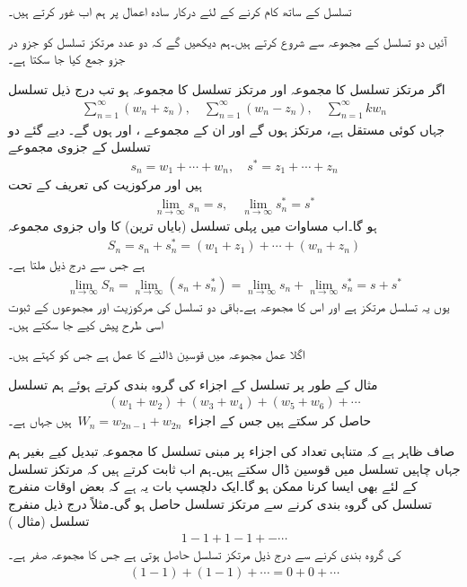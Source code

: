تسلسل کے ساتھ کام کرنے کے لئے درکار سادہ اعمال پر ہم اب غور کرتے ہیں۔

آئیں دو تسلسل کے مجموعہ سے شروع کرتے ہیں۔ہم دیکھیں گے کہ دو عدد مرتکز تسلسل کو جزو در جزو جمع کیا جا سکتا ہے۔

\quad
اگر مرتکز تسلسل  کا مجموعہ  اور مرتکز تسلسل  کا مجموعہ  ہو تب درج ذیل تسلسل
\begin{align}\label{مساوات_ترتیب_اعمال_الف}
\sum\limits_{n=1}^{\infty} (w_n+z_n), \quad \sum\limits_{n=1}^{\infty} (w_n-z_n), \quad \sum\limits_{n=1}^{\infty} kw_n
\end{align}
جہاں  کوئی مستقل ہے، مرتکز ہوں گے اور ان کے مجموعے ،  اور  ہوں گے۔ 
\quad
دیے گئے دو تسلسل کے جزوی مجموعے
\begin{align*}
s_n=w_1+\cdots+w_n,\quad s^*=z_1+\cdots+z_n
\end{align*}
ہیں اور مرکوزیت کی تعریف کے تحت
\begin{align*}
\lim_{n\to \infty} s_n=s,\quad \lim_{n\to \infty} s^*_n=s^*
\end{align*}
ہو گا۔اب مساوات  میں   پہلی تسلسل (بایاں ترین) کا  واں جزوی مجموعہ 
\begin{align*}
S_n=s_n+s^*_n=(w_1+z_1)+\cdots+(w_n+z_n)
\end{align*}
ہے جس سے درج ذیل ملتا ہے۔
\begin{align*}
\lim_{n\to\infty}S_n=\lim_{n\to \infty} (s_n+s^*_n)=\lim_{n\to\infty} s_n+\lim_{n\to\infty} s^*_n=s+s^*
\end{align*}
یوں یہ تسلسل مرتکز ہے اور اس کا مجموعہ  ہے۔باقی دو تسلسل کی مرکوزیت اور مجموعوں کے ثبوت اسی طرح پیش کیے جا سکتے ہیں۔

اگلا عمل مجموعہ میں قوسین ڈالنے کا عمل ہے جس کو  کہتے ہیں۔ 

مثال کے طور پر تسلسل  کے اجزاء کی گروہ بندی کرتے ہوئے ہم تسلسل
\begin{align*}
(w_1+w_2)+(w_3+w_4)+(w_5+w_6)+\cdots
\end{align*}
حاصل کر سکتے ہیں جس کے اجزاء 
$\,W_n=w_{2n-1}+w_{2n}\,$
ہیں جہاں  ہے۔

صاف ظاہر ہے کہ متناہی تعداد کی اجزاء پر مبنی تسلسل کا مجموعہ تبدیل کیے بغیر ہم جہاں چاہیں تسلسل میں قوسین ڈال سکتے ہیں۔ہم اب ثابت کرتے ہیں کہ مرتکز تسلسل کے لئے بھی ایسا کرنا ممکن ہو گا۔ایک دلچسپ بات یہ ہے کہ بعض اوقات منفرج تسلسل کی گروہ بندی کرنے سے مرتکز تسلسل حاصل ہو گی۔مثلاً درج ذیل منفرج تسلسل (مثال )
\begin{align*}
1-1+1-1+-\cdots
\end{align*} 
کی گروہ بندی کرنے سے درج ذیل مرتکز تسلسل حاصل ہوتی ہے جس کا مجموعہ صفر ہے۔
\begin{align*}
(1-1)+(1-1)+\cdots=0+0+\cdots
\end{align*}

